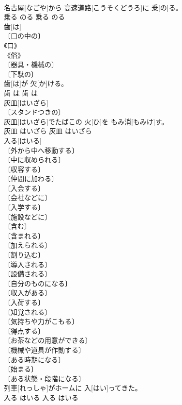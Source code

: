 \documentclass[8pt]{extreport}
\begin{document}
\begin{CJK}{UTF8}{min}
\\	名古屋[なごや]から 高速道路[こうそくどうろ]に 乗[の]る。	
\\	乗る	のる	乗る	のる	
\\	歯[は]	
\\	〔口の中の〕 
\\	《口》 
\\	《俗》 
\\	〔器具・機械の〕 
\\	〔下駄の〕 
\\	歯[は]が 欠[か]ける。	
\\	歯	は	歯	は	
\\	灰皿[はいざら]	
\\	〔スタンドつきの〕 
\\	灰皿[はいざら]でたばこの 火[ひ]を もみ消[もみけ]す。	
\\	灰皿	はいざら	灰皿	はいざら	
\\	入る[はいる]	
\\	〔外から中へ移動する〕 
\\	〔中に収められる〕 
\\	〔収容する〕 
\\	〔仲間に加わる〕 
\\	〔入会する〕 
\\	〔会社などに〕 
\\	〔入学する〕 
\\	〔施設などに〕 
\\	〔含む〕 
\\	〔含まれる〕 
\\	〔加えられる〕 
\\	〔割り込む〕 
\\	〔導入される〕 
\\	〔設備される〕 
\\	〔自分のものになる〕 
\\	〔収入がある〕 
\\	〔入荷する〕 
\\	〔知覚される〕 
\\	〔気持ちや力がこもる〕 
\\	〔得点する〕 
\\	〔お茶などの用意ができる〕 
\\	〔機械や道具が作動する〕 
\\	〔ある時期になる〕 
\\	〔始まる〕 
\\	〔ある状態・段階になる〕 
\\	列車[れっしゃ]がホームに 入[はい]ってきた。	
\\	入る	はいる	入る	はいる	

\end{CJK}
\end{document}
